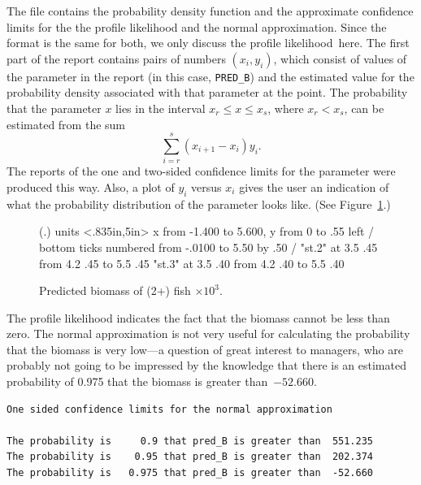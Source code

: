 \documentclass{admbmanual}
\newcommand\apl{profile likelihood}
\begin{document}
The file contains the probability density function and the 
approximate confidence limits for the the profile
likelihood and the normal approximation. Since the format is the same
for both, we only discuss the \apl\ here.
The first part of the report contains pairs of numbers 
$(x_i,y_i)$, which consist of values of the parameter in the
report (in this case, \texttt{PRED\_B}) and the estimated value for
the probability density associated with that parameter at the point.
The probability that the parameter $x$ lies in the interval
$x_r \le x\le x_s$, %
 where $x_r<x_s$, can be estimated from the sum
$$\sum_{i=r}^s (x_{i+1}-x_i)y_i.$$
The reports of the one and two-sided confidence limits for the parameter
were produced this way.
Also, a plot of $y_i$ versus $x_i$ gives the user an indication of what
the probability distribution of the parameter looks like.  (See Figure~\ref{fig:05}.)
\begin{figure}[h]
\centering\hskip1pt\beginpicture
    \setplotsymbol ({\eightrm .})
  \setcoordinatesystem units <.835in,5in>
  \setplotarea x from -1.400 to 5.600, y from 0 to .55 
  \axis left 
  /
  \axis bottom
   ticks
    numbered from -.0100 to 5.50 by .50 
  /
\setdashpattern <2pt,2pt,2pt,3pt>
 \plot  "st.2" 
 \twelverm
  at 3.5 .45
 \putrule from 4.2 .45 to 5.5 .45
\setdashpattern <1pt,3pt,4pt,3pt>
 \plot  "st.3" 
  at 3.5 .40
 \putrule from 4.2 .40 to 5.5 .40
\endpicture
\caption{Predicted biomass of (2+) fish $\times 10^3$.}
\label{fig:05}
\end{figure}

The profile likelihood
indicates the fact that the biomass cannot be less than zero.
The normal approximation is not very useful for calculating the probability 
that the biomass is very low---a question of great interest 
to managers, who are probably not going to be impressed by the
knowledge that there is an estimated probability of 0.975 that
the biomass is greater than~$-52.660$.
\begin{lstlisting}
One sided confidence limits for the normal approximation

The probability is     0.9 that pred_B is greater than  551.235
The probability is    0.95 that pred_B is greater than  202.374
The probability is   0.975 that pred_B is greater than  -52.660
\end{lstlisting}
\end{document}
